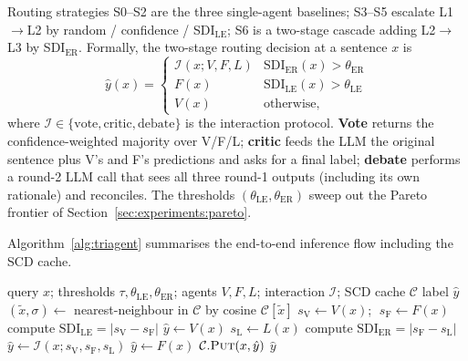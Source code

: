 Routing strategies S0--S2 are the three single-agent baselines;
S3--S5 escalate L1$\to$L2 by random / confidence /
SDI$_{\mathrm{LE}}$; S6 is a two-stage cascade adding L2$\to$L3 by
SDI$_{\mathrm{ER}}$. Formally, the two-stage routing decision at a
sentence $x$ is
\begin{equation}
\label{eq:routing}
\hat{y}(x) =
\begin{cases}
\mathcal{I}(x; V, F, L) & \mathrm{SDI}_{\mathrm{ER}}(x) > \theta_{\mathrm{ER}} \\
F(x)                    & \mathrm{SDI}_{\mathrm{LE}}(x) > \theta_{\mathrm{LE}} \\
V(x)                    & \text{otherwise,}
\end{cases}
\end{equation}
where $\mathcal{I}\in\{\text{vote}, \text{critic}, \text{debate}\}$
is the interaction protocol. \textbf{Vote} returns the
confidence-weighted majority over V/F/L; \textbf{critic} feeds the
LLM the original sentence plus V's and F's predictions and asks for
a final label; \textbf{debate} performs a round-2 LLM call that sees
all three round-1 outputs (including its own rationale) and
reconciles. The thresholds $(\theta_{\mathrm{LE}},
\theta_{\mathrm{ER}})$ sweep out the Pareto frontier of
Section~\ref{sec:experiments:pareto}.

Algorithm~\ref{alg:triagent} summarises the end-to-end inference
flow including the SCD cache.

\begin{algorithm}[t]
\caption{TriAgent inference (single query)}
\label{alg:triagent}
\begin{algorithmic}[1]
\Require query $x$; thresholds $\tau, \theta_{\mathrm{LE}}, \theta_{\mathrm{ER}}$;
agents $V, F, L$; interaction $\mathcal{I}$; SCD cache $\mathcal{C}$
\Ensure label $\hat{y}$
\State $(\tilde{x}, \sigma) \gets$ nearest-neighbour in $\mathcal{C}$ by cosine
\If{$\sigma \ge \tau$}
  \State \Return $\mathcal{C}[\tilde{x}]$ 
\EndIf
\State $s_{\mathrm{V}} \gets V(x)$; $\;s_{\mathrm{F}} \gets F(x)$
\State compute $\mathrm{SDI}_{\mathrm{LE}}=|s_{\mathrm{V}}-s_{\mathrm{F}}|$
  \State $\hat{y} \gets V(x)$ 
\Else
  \State $s_{\mathrm{L}} \gets L(x)$
  \State compute $\mathrm{SDI}_{\mathrm{ER}}=|s_{\mathrm{F}}-s_{\mathrm{L}}|$
    \State $\hat{y} \gets \mathcal{I}(x; s_{\mathrm{V}}, s_{\mathrm{F}}, s_{\mathrm{L}})$
  \Else
    \State $\hat{y} \gets F(x)$
  \EndIf
\EndIf
\State $\mathcal{C}.\textsc{Put}(x, \hat{y})$
\State \Return $\hat{y}$
\end{algorithmic}
\end{algorithm}

